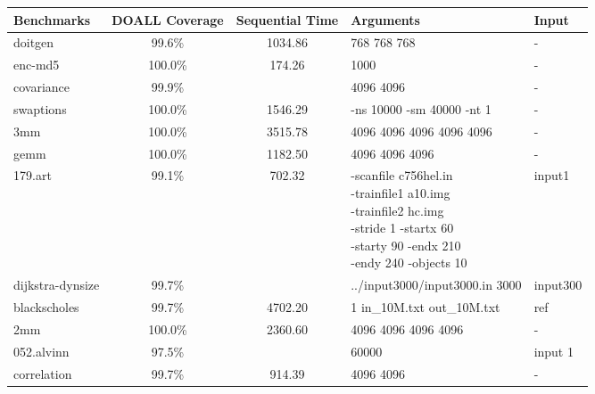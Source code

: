 \small
\centering
\begin{tabular}{|l|c|c|l|l|}
\hline
Benchmarks & DOALL Coverage & Sequential Time & Arguments & Input    \\
\hline
doitgen    & 99.6\%  & 1034.86 & 768 768 768 & -  \\
\hline
enc-md5    & 100.0\% & 174.26    & 1000 & -  \\
\hline
covariance & 99.9\%  &     & 4096 4096 & -  \\
\hline
swaptions  & 100.0\% & 1546.29   & -ns 10000 -sm 40000 -nt 1 & -  \\
\hline
3mm  & 100.0\%       & 3515.78   & 4096 4096 4096 4096 4096                & -  \\
\hline
gemm       & 100.0\% & 1182.50   & 4096 4096 4096                    & -  \\
\hline
179.art    & 99.1\%  & 702.32    &
{\parbox[l]{5cm}{-scanfile c756hel.in \\-trainfile1 a10.img \\-trainfile2 hc.img\\ -stride 1 -startx 60 \\-starty 90 -endx 210 \\ -endy 240 -objects 10}} & input1   \\
\hline
dijkstra-dynsize & 99.7\%  &     & ../input3000/input3000.in 3000                & input300 \\
\hline
blackscholes & 99.7\% & 4702.20   & 1 in\_10M.txt out\_10M.txt                & ref      \\
\hline
2mm  & 100.0\%       & 2360.60   & 4096 4096 4096 4096               & -  \\
\hline
052.alvinn & 97.5\%  &     & 60000                 & input 1  \\
\hline
correlation & 99.7\%  & 914.39    & 4096 4096                   & - \\
\hline
\end{tabular}